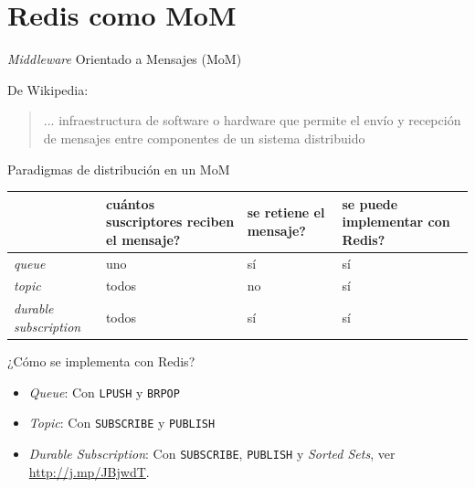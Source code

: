 \documentclass[spanish,xcolor=dvipsnames]{beamer}
\begin{document}
\section{Redis como MoM}

\begin{frame}{\textit{Middleware} Orientado a Mensajes (MoM)}
  \begin{block}{De Wikipedia:}
    \begin{quotation}
       ... infraestructura de software o hardware que permite el envío
       y recepción de mensajes entre componentes de un sistema
       distribuido
     \end{quotation}
  \end{block}
\end{frame}

\begin{frame}{Paradigmas de distribución en un MoM}
  \begin{center}
  \begin{tabular}{ l || p{2cm} | p{2cm} | p{2cm} }
                 & \scriptsize cuántos suscriptores reciben el mensaje?
                 & \scriptsize se retiene el mensaje?
                 & \scriptsize se puede implementar con Redis? \\
    \hline\hline
    \textit{queue}                & uno   & sí & sí \\
    \textit{topic}                & todos & no & sí \\
    \textit{durable subscription} & todos & sí & sí \\
  \end{tabular}
  \end{center}

  \pause

  \vspace{\baselineskip}

  ¿Cómo se implementa con Redis?

  \begin{itemize}\addtolength{\itemsep}{0.5\baselineskip}
    \item \textit{Queue}: Con \texttt{LPUSH} y \texttt{BRPOP}
    \pause
    \item \textit{Topic}: Con \texttt{SUBSCRIBE} y \texttt{PUBLISH}
    \pause
    \item \textit{Durable Subscription}: Con \texttt{SUBSCRIBE}, \texttt{PUBLISH}
      y \textit{Sorted Sets}, ver \url{http://j.mp/JBjwdT}.
  \end{itemize}
\end{frame}
\end{document}
